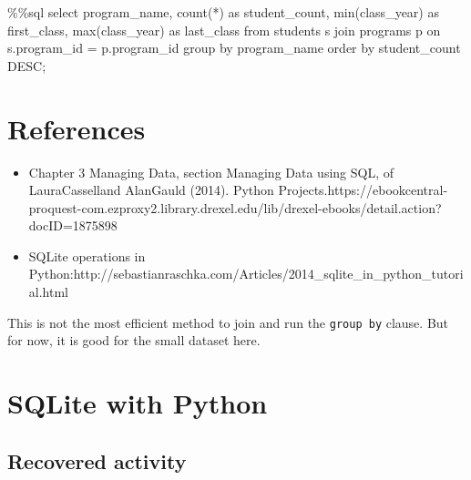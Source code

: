 \documentclass[
  letterpaper,
]{scrbook}
\newenvironment{Shaded}{\begin{snugshade}}{\end{snugshade}}
\newcommand{\BuiltInTok}[1]{\textcolor[rgb]{0.00,0.23,0.31}{#1}}
\newcommand{\ImportTok}[1]{\textcolor[rgb]{0.00,0.46,0.62}{#1}}
\newcommand{\NormalTok}[1]{\textcolor[rgb]{0.00,0.23,0.31}{#1}}
\newcommand{\OperatorTok}[1]{\textcolor[rgb]{0.37,0.37,0.37}{#1}}
\providecommand{\tightlist}{%
  \setlength{\itemsep}{0pt}\setlength{\parskip}{0pt}}
\begin{document}
\begin{Shaded}
\begin{Highlighting}[]
\OperatorTok{\%\%}\NormalTok{sql}
\NormalTok{select program\_name, }
\NormalTok{       count(}\OperatorTok{*}\NormalTok{) }\ImportTok{as}\NormalTok{ student\_count, }
       \BuiltInTok{min}\NormalTok{(class\_year) }\ImportTok{as}\NormalTok{ first\_class, }
       \BuiltInTok{max}\NormalTok{(class\_year) }\ImportTok{as}\NormalTok{ last\_class}
\ImportTok{from}\NormalTok{ students s join programs p on s.program\_id }\OperatorTok{=}\NormalTok{ p.program\_id}
\NormalTok{group by program\_name}
\NormalTok{order by student\_count DESC}\OperatorTok{;}
\end{Highlighting}
\end{Shaded}

\chapter*{References}\label{references-5}


\begin{itemize}
\tightlist
\item
  Chapter 3 Managing Data, section Managing Data using SQL, of
  LauraCasselland AlanGauld (2014). Python
  Projects.https://ebookcentral-proquest-com.ezproxy2.library.drexel.edu/lib/drexel-ebooks/detail.action?docID=1875898
\item
  SQLite operations in
  Python:http://sebastianraschka.com/Articles/2014\_sqlite\_in\_python\_tutorial.html
\end{itemize}

This is not the most efficient method to join and run the
\texttt{group\ by} clause. But for now, it is good for the small dataset
here.

\chapter*{SQLite with Python}\label{ch-lab-sqlite-python}


\section*{Recovered activity}\label{sec-lab-sqlite-python}
\end{document}
